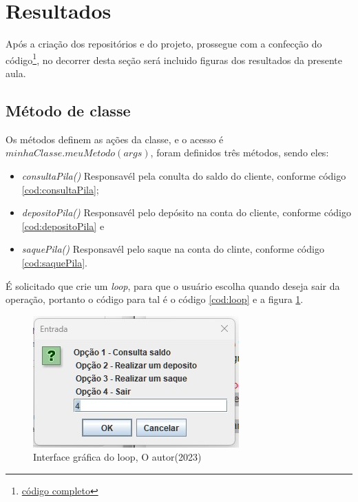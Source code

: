 \section{Resultados}

\par Após a criação dos repositórios e do projeto, prossegue com a confecção do código\footnote{\hyperref[anexo]{código completo}}, no decorrer desta seção será incluido figuras dos resultados da presente aula.




\subsection{Método de classe}

\par Os métodos definem as ações da classe, e o acesso é $minhaClasse.meuMetodo(args)$, foram definidos três métodos, sendo eles:
\begin{itemize}
  \item \textit{consultaPila()} Responsavél pela conulta do saldo do cliente, conforme código \ref{cod:consultaPila};
  \item \textit{depositoPila()} Responsavél pelo depósito na conta do cliente, conforme código \ref{cod:depositoPila} e
  \item \textit{saquePila()} Responsavél pelo saque na conta do clinte, conforme código \ref{cod:saquePila}.
\end{itemize}








\par É solicitado que crie um \textit{loop}, para que o usuário escolha quando deseja sair da operação, portanto o código para tal é o código \ref{cod:loop} e a figura \ref{fig:loop}.


\begin{figure}[h!]
  \centering
  \includegraphics[scale=0.8]{figure/menu.jpg}
  \caption{Interface gráfica do loop, O autor(2023)}\label{fig:loop}
\end{figure}

